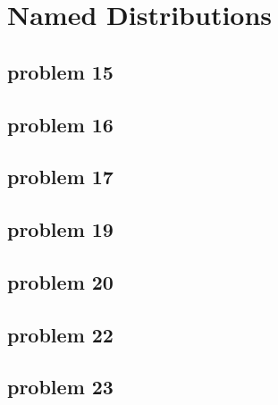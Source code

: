 \section{Named Distributions}

\subsection{problem 15}


\subsection{problem 16}


\subsection{problem 17}


\subsection{problem 19}


\subsection{problem 20}


\subsection{problem 22}


\subsection{problem 23}


